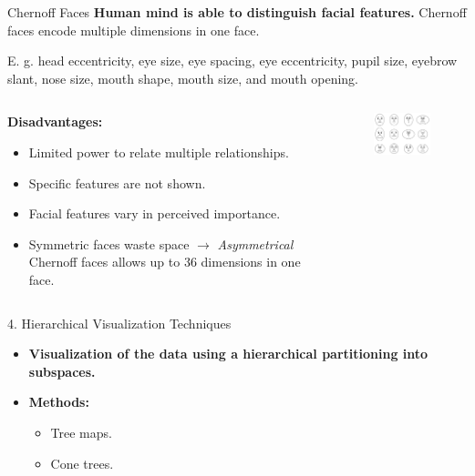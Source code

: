 \begin{frame}{Chernoff Faces}
	\textbf{Human mind is able to distinguish facial features.} Chernoff faces
	encode multiple dimensions in one face.

	E. g. head eccentricity, eye size, eye spacing, eye eccentricity, pupil size,
	eyebrow slant, nose size, mouth shape, mouth size, and mouth opening.

	\vspace*{1em}
	\begin{columns}[t]
		\hspace*{1.4em}
		\begin{column}{0.6\textwidth}
			\textbf{Disadvantages:}
			\begin{itemize}
				\item Limited power to relate multiple relationships.
				\item Specific features are not shown.
				\item Facial features vary in perceived importance.
				\item Symmetric faces waste space $\rightarrow$ \textit{Asymmetrical } Chernoff
				      faces allows up to 36 dimensions in one face.
			\end{itemize}
		\end{column}
		\begin{column}{0.4\textwidth}
			\vspace*{-2em}
			\begin{figure}
				\centering
				\includegraphics[width=5cm]{img/chernoff_faces.png}
			\end{figure}
		\end{column}
	\end{columns}
\end{frame}


\begin{frame}{4. Hierarchical Visualization Techniques}
	\centering
	\begin{itemize}
		\item \textbf{Visualization of the data using a hierarchical partitioning into subspaces.}
		\item \textbf{Methods:}
		      \begin{itemize}
			      \item Tree maps.
			      \item Cone trees.
		      \end{itemize}
	\end{itemize}
\end{frame}


